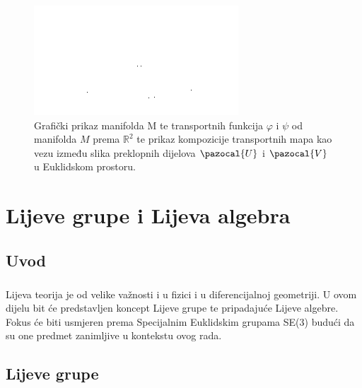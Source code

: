 \documentclass[times, utf8, diplomski]{fer}
\newcommand{\Va}{\pazocal{V}}
\newcommand{\Ua}{\pazocal{U}}
\begin{document}
	\begin{figure}[h]
		\includegraphics[width=\textwidth]{fig_overlap_charts.png}
		\caption{Grafički prikaz manifolda M te transportnih funkcija $\varphi$ i $\psi$ od manifolda $M$ prema $\mathbb{R}^2$ te prikaz kompozicije transportnih mapa kao vezu između slika preklopnih dijelova $\Ua$ i $\Va$ u Euklidskom prostoru.}
	\end{figure}
	
	
\chapter{Lijeve grupe i Lijeva algebra}

\section{Uvod}

	\paragraph{}Lijeva teorija je od velike važnosti i u fizici i u diferencijalnoj geometriji. U ovom dijelu bit će predstavljen koncept Lijeve grupe te pripadajuće Lijeve algebre. Fokus će biti usmjeren prema Specijalnim Euklidskim grupama SE(3) budući da su one predmet zanimljive u kontekstu ovog rada.
	
\section{Lijeve grupe}
\end{document}
